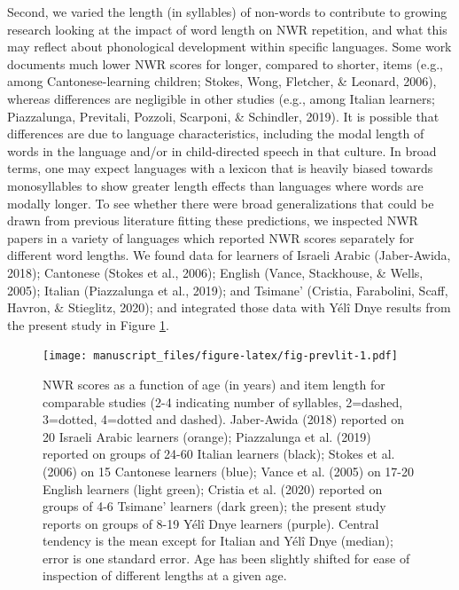 \documentclass[english,,man,floatsintext]{apa6}
\begin{document}
Second, we varied the length (in syllables) of non-words to contribute to growing research looking at the impact of word length on NWR repetition, and what this may reflect about phonological development within specific languages. Some work documents much lower NWR scores for longer, compared to shorter, items (e.g., among Cantonese-learning children; Stokes, Wong, Fletcher, \& Leonard, 2006), whereas differences are negligible in other studies (e.g., among Italian learners; Piazzalunga, Previtali, Pozzoli, Scarponi, \& Schindler, 2019). It is possible that differences are due to language characteristics, including the modal length of words in the language and/or in child-directed speech in that culture. In broad terms, one may expect languages with a lexicon that is heavily biased towards monosyllables to show greater length effects than languages where words are modally longer. To see whether there were broad generalizations that could be drawn from previous literature fitting these predictions, we inspected NWR papers in a variety of languages which reported NWR scores separately for different word lengths. We found data for learners of Israeli Arabic (Jaber-Awida, 2018); Cantonese (Stokes et al., 2006); English (Vance, Stackhouse, \& Wells, 2005); Italian (Piazzalunga et al., 2019); and Tsimane' (Cristia, Farabolini, Scaff, Havron, \& Stieglitz, 2020); and integrated those data with Yélî Dnye results from the present study in Figure \ref{fig:fig-prevlit}.

\begin{figure}
\centering
\texttt{[image: manuscript\_files/figure-latex/fig-prevlit-1.pdf]}
\caption{\label{fig:fig-prevlit}NWR scores as a function of age (in years) and item length for comparable studies (2-4 indicating number of syllables, 2=dashed, 3=dotted, 4=dotted and dashed). Jaber-Awida (2018) reported on 20 Israeli Arabic learners (orange); Piazzalunga et al. (2019) reported on groups of 24-60 Italian learners (black); Stokes et al. (2006) on 15 Cantonese learners (blue); Vance et al. (2005) on 17-20 English learners (light green); Cristia et al. (2020) reported on groups of 4-6 Tsimane' learners (dark green); the present study reports on groups of 8-19 Yélî Dnye learners (purple). Central tendency is the mean except for Italian and Yélî Dnye (median); error is one standard error. Age has been slightly shifted for ease of inspection of different lengths at a given age.}
\end{figure}
\end{document}
